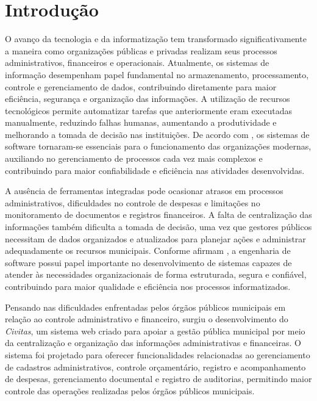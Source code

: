 \chapter{Introdução}

O avanço da tecnologia e da informatização tem transformado significativamente a maneira como organizações públicas e privadas realizam seus processos administrativos, financeiros e operacionais. Atualmente, os sistemas de informação desempenham papel fundamental no armazenamento, processamento, controle e gerenciamento de dados, contribuindo diretamente para maior eficiência, segurança e organização das informações. A utilização de recursos tecnológicos permite automatizar tarefas que anteriormente eram executadas manualmente, reduzindo falhas humanas, aumentando a produtividade e melhorando a tomada de decisão nas instituições. De acordo com \textcite{Sommerville2018ES10}, os sistemas de software tornaram-se essenciais para o funcionamento das organizações modernas, auxiliando no gerenciamento de processos cada vez mais complexos e contribuindo para maior confiabilidade e eficiência nas atividades desenvolvidas.

A ausência de ferramentas integradas pode ocasionar atrasos em processos administrativos, dificuldades no controle de despesas e limitações no monitoramento de documentos e registros financeiros. A falta de centralização das informações também dificulta a tomada de decisão, uma vez que gestores públicos necessitam de dados organizados e atualizados para planejar ações e administrar adequadamente os recursos municipais. Conforme afirmam \textcite{Pressman2021}, a engenharia de software possui papel importante no desenvolvimento de sistemas capazes de atender às necessidades organizacionais de forma estruturada, segura e confiável, contribuindo para maior qualidade e eficiência nos processos informatizados.

Pensando nas dificuldades enfrentadas pelos órgãos públicos municipais em relação ao controle administrativo e financeiro, surgiu o desenvolvimento do \textit{Civitas}, um sistema web criado para apoiar a gestão pública municipal por meio da centralização e organização das informações administrativas e financeiras. O sistema foi projetado para oferecer funcionalidades relacionadas ao gerenciamento de cadastros administrativos, controle orçamentário, registro e acompanhamento de despesas, gerenciamento documental e registro de auditorias, permitindo maior controle das operações realizadas pelos órgãos públicos municipais.

